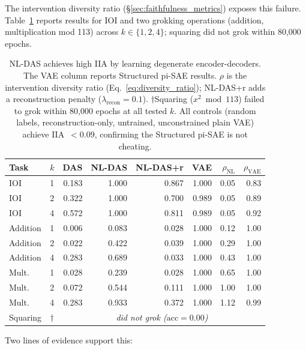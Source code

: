 \documentclass{article}
\begin{document}
The intervention diversity ratio (\S\ref{sec:faithfulness_metrics}) exposes this
failure. Table~\ref{tab:nldas_vacuous} reports results for IOI and two
grokking operations (addition, multiplication mod 113) across $k \in \{1, 2, 4\}$;
squaring did not grok within 80{,}000 epochs.

\begin{table}[t]
\centering
\small
\setlength{\tabcolsep}{3pt}
\begin{tabular}{lc rrrr rr}
\toprule
Task & $k$ & DAS & NL-DAS & NL-DAS+r & VAE & $\rho_\text{NL}$ & $\rho_\text{VAE}$ \\
\midrule
IOI & 1 & 0.183 & 1.000 & 0.867 & 1.000 & 0.05 & 0.83 \\
IOI & 2 & 0.322 & 1.000 & 0.700 & 0.989 & 0.05 & 0.89 \\
IOI & 4 & 0.572 & 1.000 & 0.811 & 0.989 & 0.05 & 0.92 \\
\midrule
Addition & 1 & 0.006 & 0.083 & 0.028 & 1.000 & 0.12 & 1.00 \\
Addition & 2 & 0.022 & 0.422 & 0.039 & 1.000 & 0.29 & 1.00 \\
Addition & 4 & 0.283 & 0.689 & 0.033 & 1.000 & 0.43 & 1.00 \\
\midrule
Mult.\ & 1 & 0.028 & 0.239 & 0.028 & 1.000 & 0.65 & 1.00 \\
Mult.\ & 2 & 0.072 & 0.544 & 0.111 & 1.000 & 1.00 & 1.00 \\
Mult.\ & 4 & 0.283 & 0.933 & 0.372 & 1.000 & 1.12 & 0.99 \\
\midrule
Squaring & $\dagger$ & \multicolumn{6}{c}{\emph{did not grok ($\text{acc} = 0.00$)}} \\
\bottomrule
\end{tabular}
\caption{NL-DAS achieves high IIA by learning degenerate encoder-decoders.
  The VAE column reports Structured pi-SAE results.
  $\rho$ is the intervention diversity ratio (Eq.~\ref{eq:diversity_ratio});
  NL-DAS+r adds a reconstruction penalty ($\lambda_\text{recon} = 0.1$).
  $\dagger$Squaring ($x^2 \bmod 113$) failed to grok within 80{,}000 epochs
  at all tested $k$.
  All controls (random labels, reconstruction-only, untrained, unconstrained
  plain VAE) achieve IIA~$< 0.09$, confirming the Structured pi-SAE is not
  cheating.}
\label{tab:nldas_vacuous}
\end{table}

Two lines of evidence support this:
\end{document}
